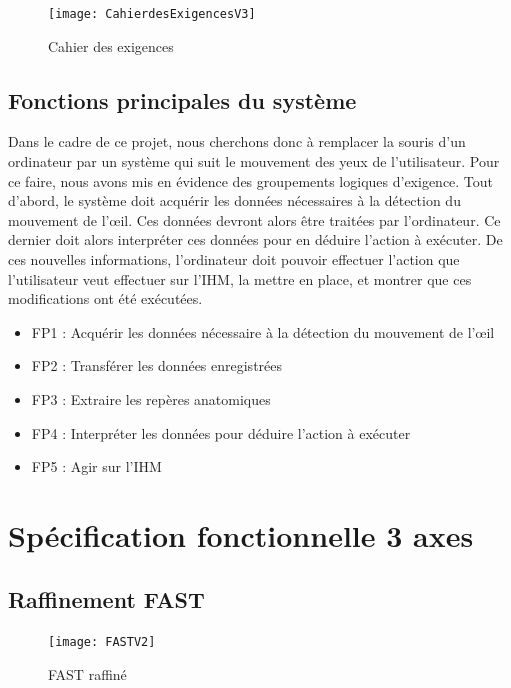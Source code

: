 \begin{figure}[H]
  \centering
  \texttt{[image: CahierdesExigencesV3]}
  \caption{Cahier des exigences}
  \label{fig:exigences}
\end{figure}

\subsection{Fonctions principales du système}

Dans le cadre de ce projet, nous cherchons donc à remplacer la souris d'un ordinateur par un système qui suit le mouvement des yeux de l'utilisateur. Pour ce faire, nous avons mis en évidence des groupements logiques d'exigence. Tout d'abord, le système doit acquérir les données nécessaires à la détection du mouvement de l'œil. Ces données devront alors être traitées par l'ordinateur. Ce dernier doit alors interpréter ces données pour en déduire l'action à exécuter. De ces nouvelles informations, l'ordinateur doit pouvoir effectuer l'action que l'utilisateur veut effectuer sur l'IHM, la mettre en place, et montrer que ces modifications ont été exécutées. 

\begin{itemize}[label=\textbullet,font=\color{black}]
\item FP1 : Acquérir les données nécessaire à la détection du mouvement de l'œil 
\item\colorbox{sable}{FP2 : Transférer les données enregistrées}
\item FP3 : Extraire les repères anatomiques
\item FP4 : Interpréter les données pour déduire l'action à exécuter 
\item FP5 : Agir sur l'IHM 
\end{itemize}

\section{Spécification fonctionnelle  3 axes}

\subsection{Raffinement FAST}

\begin{figure}[H]
  \centering
  \texttt{[image: FASTV2]}
  \caption{FAST raffiné}
  \label{fig:FAST}
\end{figure}

